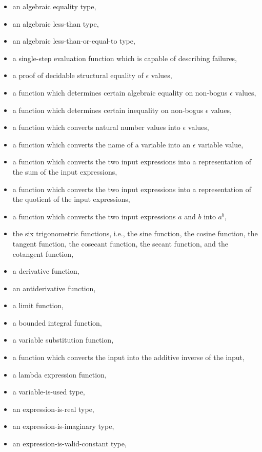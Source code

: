 \documentclass{report}
\begin{document}
\begin{itemize}
  \item an algebraic equality type,
  \item an algebraic less-than type,
  \item an algebraic less-than-or-equal-to type,
  \item a single-step evaluation function which is capable of describing failures,
  \item a proof of decidable structural equality of \(\epsilon\) values,
  \item a function which determines certain algebraic equality on non-bogus \(\epsilon\) values,
  \item a function which determines certain inequality on non-bogus \(\epsilon\) values,
  \item a function which converts natural number values into \(\epsilon\) values,
  \item a function which converts the name of a variable into an \(\epsilon\) variable value,
  \item a function which converts the two input expressions into a representation of the sum of the input expressions,
  \item a function which converts the two input expressions into a representation of the quotient of the input expressions,
  \item a function which converts the two input expressions \(a\) and \(b\) into \(a^b\),
  \item the six trigonometric functions, i.e., the sine function, the cosine function, the tangent function, the cosecant function, the secant function, and the cotangent function,
  \item a derivative function,
  \item an antiderivative function,
  \item a limit function,
  \item a bounded integral function,
  \item a variable substitution function,
  \item a function which converts the input into the additive inverse of the input,
  \item a lambda expression function,
  \item a variable-is-used type,
  \item an expression-is-real type,
  \item an expression-is-imaginary type,
  \item an expression-is-valid-constant type,

\end{itemize}
\end{document}

